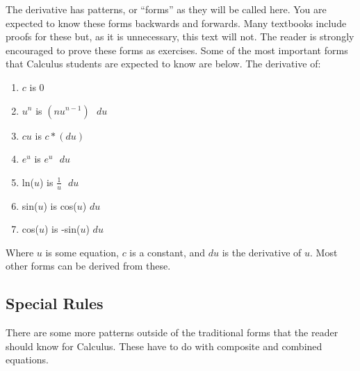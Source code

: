 \documentclass[../revisedmain.tex]{subfiles}
\begin{document}
\par The derivative has patterns, or ``forms'' as they will be called here. You are expected to know these forms backwards and forwards. Many textbooks include proofs for these but, as it is unnecessary, this text will not. The reader is strongly encouraged to prove these forms as exercises. Some of the most important forms that Calculus students are expected to know are below. The derivative of:
\begin{enumerate}
	\item $c$ is 0
	\item $u^n$ is $(nu^{n-1})\text{ } du$
	\item $cu$ is $c*(du)$
	\item $e^u$ is $e^u\text{ } du$
	\item ln($u$) is $\frac{1}{u}\text{ }du$
	\item sin($u$) is cos($u$) $du$
	\item cos($u$) is -sin($u$) $du$
\end{enumerate}
Where $u$ is some equation, $c$ is a constant, and $du$ is the derivative of $u$. Most other forms can be derived from these.
\subsection{Special Rules}
\par There are some more patterns outside of the traditional forms that the reader should know for Calculus. These have to do with composite and combined equations.
\end{document}
